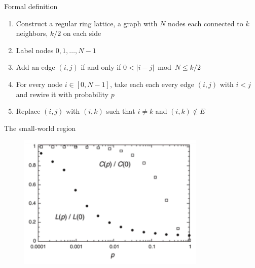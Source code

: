 \begin{frame}{Formal definition}
	
\begin{definition}
\begin{enumerate}
\item Construct a regular ring lattice, a graph with $N$ nodes each connected to $k$ neighbors, $k/2$ on each side
  \BI
  \item Label nodes $0, 1, \ldots, N-1$
  \item Add an edge $(i,j)$ if and only if $0 < |i-j| \bmod N \leq k/2$
  \EI
\item For every node $i \in [0, N-1]$, take each each every edge $(i,j)$ with $i<j$ and rewire it with probability $p$
  \BI
  \item Replace $(i,j)$ with $(i,k)$ such that $i \neq k$ and $(i,k) \notin E$ 
  \EI
\end{enumerate}
\end{definition}


\end{frame}

\begin{frame}{The small-world region}

\begin{figure}
	\includegraphics[width=0.8\textwidth]{figs/08/watts-sim}
\end{figure}
	
\end{frame}

